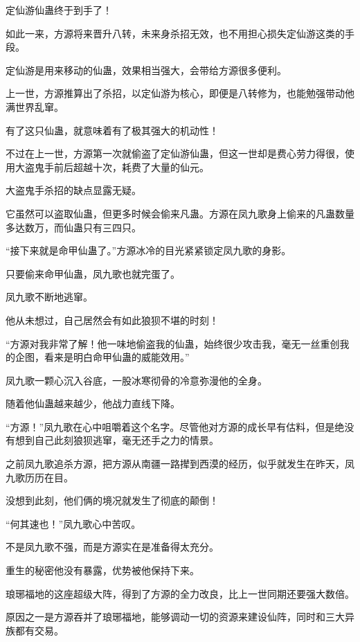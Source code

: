 
\begin{this_body}



定仙游仙蛊终于到手了！

如此一来，方源将来晋升八转，未来身杀招无效，也不用担心损失定仙游这类的手段。

定仙游是用来移动的仙蛊，效果相当强大，会带给方源很多便利。

上一世，方源推算出了杀招，以定仙游为核心，即便是八转修为，也能勉强带动他满世界乱窜。

有了这只仙蛊，就意味着有了极其强大的机动性！

不过在上一世，方源第一次就偷盗了定仙游仙蛊，但这一世却是费心劳力得很，使用大盗鬼手前后超越十次，耗费了大量的仙元。

大盗鬼手杀招的缺点显露无疑。

它虽然可以盗取仙蛊，但更多时候会偷来凡蛊。方源在凤九歌身上偷来的凡蛊数量多达数万，而仙蛊只有三四只。

“接下来就是命甲仙蛊了。”方源冰冷的目光紧紧锁定凤九歌的身影。

只要偷来命甲仙蛊，凤九歌也就完蛋了。

凤九歌不断地逃窜。

他从未想过，自己居然会有如此狼狈不堪的时刻！

“方源对我非常了解！他一味地偷盗我的仙蛊，始终很少攻击我，毫无一丝重创我的企图，看来是明白命甲仙蛊的威能效用。”

凤九歌一颗心沉入谷底，一股冰寒彻骨的冷意弥漫他的全身。

随着他仙蛊越来越少，他战力直线下降。

“方源！”凤九歌在心中咀嚼着这个名字。尽管他对方源的成长早有估料，但是绝没有想到自己此刻狼狈逃窜，毫无还手之力的情景。

之前凤九歌追杀方源，把方源从南疆一路撵到西漠的经历，似乎就发生在昨天，凤九歌历历在目。

没想到此刻，他们俩的境况就发生了彻底的颠倒！

“何其速也！”凤九歌心中苦叹。

不是凤九歌不强，而是方源实在是准备得太充分。

重生的秘密他没有暴露，优势被他保持下来。

琅琊福地的这座超级大阵，得到了方源的全力改良，比上一世同期还要强大数倍。

原因之一是方源吞并了琅琊福地，能够调动一切的资源来建设仙阵，同时和三大异族都有交易。


\end{this_body}
